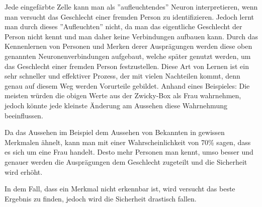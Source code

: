 Jede eingefärbte Zelle kann man als ''aufleuchtendes'' Neuron interpretieren, wenn man versucht das Geschlecht einer fremden Person zu identifizieren. Jedoch lernt man durch dieses ''Aufleuchten'' nicht, da man das eigentliche Geschlecht der Person nicht kennt und man daher keine Verbindungen aufbauen kann. Durch das Kennenlernen von Personen und Merken derer Ausprägungen werden diese oben genannten Neuronenverbindungen aufgebaut, welche später genutzt werden, um das Geschlecht einer fremden Person festzustellen. Diese Art von Lernen ist ein sehr schneller und effektiver Prozess, der mit vielen Nachteilen kommt, denn genau auf diesem Weg werden Vorurteile gebildet. Anhand eines Beispieles: Die meisten würden die obigen Werte aus der Zwicky-Box als Frau wahrnehmen, jedoch könnte jede kleinste Änderung am Aussehen diese Wahrnehmung beeinflussen.

\begin{table}[ht]
    \centering
    \caption{Ergebnis einer Ausprägung}
\end{table}

Da das Aussehen im Beispiel dem Aussehen von Bekannten in gewissen Merkmalen ähnelt, kann man mit einer Wahrscheinlichkeit von 70\% sagen, dass es sich um eine Frau handelt. Desto mehr Personen man kennt, umso besser und genauer werden die Ausprägungen dem Geschlecht zugeteilt und die Sicherheit wird erhöht. 

In dem Fall, dass ein Merkmal nicht erkennbar ist, wird versucht das beste Ergebnis zu finden, jedoch wird die Sicherheit drastisch fallen.

